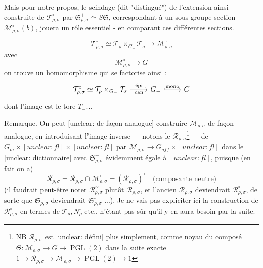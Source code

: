 \begin{enumerate}
Mais pour notre propos, le
scindage (dit "distingué") de l'extension ainsi construite
de $\mathcal{T}^\circ_{\rho,\sigma}$ par $\mathfrak{S}^+_{\rho,\sigma} \simeq S\mathfrak{S}$, correspondant
à un sous-groupe section $\mathcal{M}^\circ_{\rho,\sigma}(b)$, jouera un
rôle essentiel - en comparant ces différentes sections.

\newpage


$$ \mathcal{T}_{\rho,\sigma}^\circ \simeq \mathcal{T}_\rho \times_{G_-} \mathcal{T}_\sigma \longrightarrow \mathcal{M}_{\rho,\sigma}^\circ $$
avec
$$ \mathcal{M}_{\rho,\sigma}^\circ \longrightarrow G $$
on trouve un homomorphisme qui se factorise ainsi :
$$ 
\begin{tikzcd}
\mathcal{T}_{\rho,\sigma}^\circ \simeq \mathcal{T}_\rho \times_{G_-} \mathcal{T}_\sigma \arrow[r, "\text{épi}", "\text{can}"'] & G_- \arrow[r, hook, "\text{mono}"] & G
\end{tikzcd}
$$
dont l'image est le tore $T_-$...

Remarque. On peut [unclear: de façon analogue] construire $\mathcal{M}_{\rho,\sigma}$ de façon analogue, en introduisant l'image inverse --- notons le $\mathcal{R}_{\rho,\sigma}$\footnote{NB $\mathcal{R}_{\rho,\sigma}$ est [unclear: défini] plus simplement, comme noyau du composé $\overline{\Theta} : \mathcal{M}_{\rho,\sigma} \to G \to \operatorname{PGL}(2)$ dans la suite exacte $1 \to \mathcal{R}_{\rho,\sigma} \to \mathcal{M}_{\rho,\sigma} \to \operatorname{PGL}(2) \to 1$} --- de $G_m \times [unclear: fl] \times [unclear: fl]$ par $\mathcal{M}_{\rho,\sigma} \to G_{aff} \times [unclear: fl]$ dans le [unclear: dictionnaire] avec $\mathfrak{S}_{\rho,\sigma}^+$ évidemment égale à $[unclear: fl]$, puisque (en fait on a)
$$ \mathcal{R}_{\rho,\sigma}^\circ = \mathcal{R}_{\rho,\sigma} \cap \mathcal{M}_{\rho,\sigma}^\circ = (\mathcal{R}_{\rho,\sigma})^\circ \quad \text{(composante neutre)} $$
(il faudrait peut-être noter $\mathcal{R}_{\rho,\sigma}^\sim$ plutôt $\mathcal{R}_{\rho,\sigma}$, et l'ancien $\mathcal{R}_{\rho,\sigma}$ deviendrait $\mathcal{R}_{\rho,\sigma}^\circ$, de sorte que $\mathfrak{S}_{\rho,\sigma}$ deviendrait $\mathfrak{S}_{\rho,\sigma}^\circ$ ...).
Je ne vais pas expliciter ici la construction de $\mathcal{R}_{\rho,\sigma}^\circ$ en termes de $\mathcal{T}_\rho, N_{\rho}^\circ$ etc., n'étant pas sûr qu'il y en aura besoin par la suite.

\newpage



\end{enumerate}
